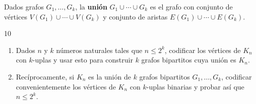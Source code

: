 \vspace{0.5cm}

\begin{definition}
    Dados grafos \( G_1, \ldots, G_k \), la \textbf{unión} \( G_1 \cup \cdots \cup G_k \) es el grafo con conjunto de vértices \( V(G_1) \cup \cdots \cup V(G_k) \) y conjunto de aristas \( E(G_1) \cup \cdots \cup E(G_k) \).
\end{definition}

\begin{ejercicioEntregar}{10}
    \begin{enumerate}
        \item Dados \( n \) y \( k \) números naturales tales que \( n \leq 2^k \), codificar los vértices de \( K_n \) con \( k \)-uplas y usar esto para construir \( k \) grafos bipartitos cuya unión es \( K_n \).
        \item Recíprocamente, si \( K_n \) es la unión de \( k \) grafos bipartitos \( G_1, \ldots, G_k \), codificar convenientemente los vértices de \( K_n \) con \( k \)-uplas binarias y probar así que \( n \leq 2^k \).
    \end{enumerate}
\end{ejercicioEntregar}
